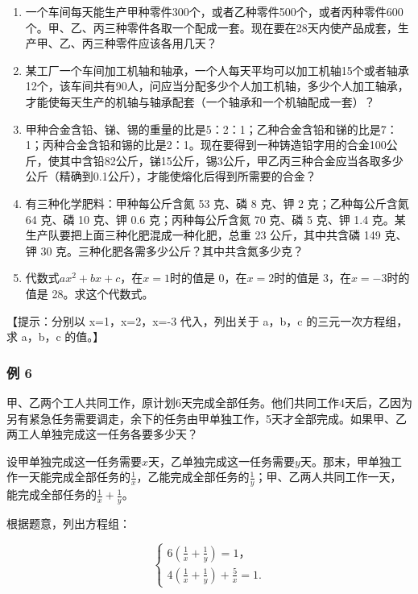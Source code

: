 \begin{enumerate}[start=4]
\item
  一个车间每天能生产甲种零件300个，或者乙种零件500个，或者丙种零件600个。甲、乙、丙三种零件各取一个配成一套。现在要在28天内使产品成套，生产甲、乙、丙三种零件应该各用几天？
\item
  某工厂一个车间加工机轴和轴承，一个人每天平均可以加工机轴15个或者轴承12个，该车间共有90人，问应当分配多少个人加工机轴，多少个人加工轴承，才能使每天生产的机轴与轴承配套（一个轴承和一个机轴配成一套）？
\item
  甲种合金含铅、锑、锡的重量的比是5：2：1；乙种合金含铅和锑的比是7：1；丙种合金含铅和锡的比是2：1。现在要得到一种铸造铅字用的合金100公斤，使其中含铅82公斤，锑15公斤，锡3公斤，甲乙丙三种合金应当各取多少公斤（精确到0.1公斤），才能使熔化后得到所需要的合金？
\item
  有三种化学肥料：甲种每公斤含氮 53 克、磷 8 克、钾 2 克；乙种每公斤含氮
  64 克、磷 10 克、钾 0.6 克；丙种每公斤含氮 70 克、磷 5 克、钾 1.4
  克。某生产队要把上面三种化肥混成一种化肥，总重 23 公斤，其中共含磷 149
  克、钾 30 克。三种化肥各需多少公斤？其中共含氮多少克？
\item
  代数式\(ax^2 + bx + c\)，在\(x = 1\)时的值是 0，在\(x = 2\)时的值是
  3，在\(x = -3\)时的值是 28。求这个代数式。
\end{enumerate}

【提示：分别以 x=1，x=2，x=-3 代入，列出关于 a，b，c
的三元一次方程组，求 a，b，c 的值。】

\subsubsection{例 6}

甲、乙两个工人共同工作，原计划6天完成全部任务。他们共同工作4天后，乙因为另有紧急任务需要调走，余下的任务由甲单独工作，5天才全部完成。如果甲、乙两工人单独完成这一任务各要多少天？

设甲单独完成这一任务需要\(x\)天，乙单独完成这一任务需要\(y\)天。那末，甲单独工作一天能完成全部任务的\(\frac{1}{x}\)，乙能完成全部任务的\(\frac{1}{y}\)；甲、乙两人共同工作一天，能完成全部任务的\(\frac{1}{x} + \frac{1}{y}\)。

根据题意，列出方程组：

\[
\left\{ \begin{array}{l} 6 \left(\frac{1}{x} + \frac{1}{y}\right) = 1\text{，} \\ 4 \left(\frac{1}{x} + \frac{1}{y}\right) + \frac{5}{x} = 1. \end{array} \right. \tag{1}
\]

